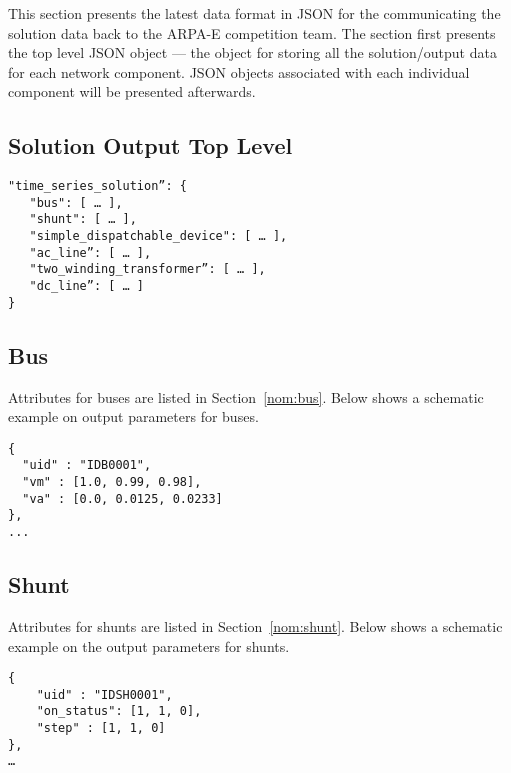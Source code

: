 \label{sec:solution_format}
This section presents the latest data format in JSON for the 
communicating the solution data back to the ARPA-E competition team.
The section first presents the top level JSON object --- the
object for storing all the solution/output data 
for each network component.
JSON objects associated with each individual component will be presented afterwards.


\subsection{Solution Output Top Level}
\label{sec:output_data}
\begin{verbatim}
"time_series_solution”: {
   "bus": [ … ],
   "shunt": [ … ],
   "simple_dispatchable_device": [ … ],
   "ac_line”: [ … ],
   "two_winding_transformer”: [ … ],
   "dc_line”: [ … ]
}    
\end{verbatim}


\subsection{Bus}
Attributes for buses are listed in Section~\ref{nom:bus}.
Below shows a schematic example on output parameters for buses.
\begin{verbatim}
{
  "uid" : "IDB0001",
  "vm" : [1.0, 0.99, 0.98],
  "va" : [0.0, 0.0125, 0.0233]
},
...
\end{verbatim}

\subsection{Shunt}
Attributes for shunts are listed in Section~\ref{nom:shunt}.
Below shows a schematic example on the output parameters for shunts.
\begin{verbatim}
{
    "uid" : "IDSH0001",
    "on_status": [1, 1, 0],
    "step" : [1, 1, 0]
},
…    
\end{verbatim}

